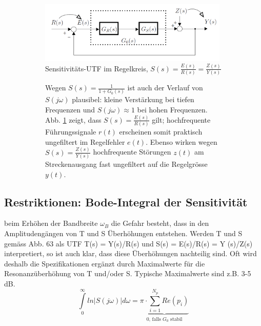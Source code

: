 \begin{figure}[h!]
	\begin{center}
	\begin{subfigure}[b]{9cm}
	\flushleft
			\includegraphics[width=9cm]{./images/SensitivitaetsUTF.png}
\caption{Sensitivitäts-UTF im Regelkreis, $S(s) = \frac{E(s)}{R(s)}=\frac{Z(s)}{Y(s)}$}
			\label{SensitivitaetRegelkreis}
	\end{subfigure}\qquad
	\begin{subfigure}[b]{8cm}
Wegen $S(s) = \frac{1}{1+G_0(s)}$ ist auch der Verlauf von $S(j\omega)$ plausibel: kleine Verstärkung
bei tiefen Frequenzen und $S(j\omega) \approx 1$ bei hohen Frequenzen. Abb. \ref{SensitivitaetRegelkreis} zeigt,
dass $S(s) = \frac{E(s)}{R(s)}$ gilt; hochfrequente Führungssignale $r(t)$ erscheinen somit praktisch
ungefiltert im Regelfehler $e(t)$. Ebenso wirken wegen $S(s) = \frac{Z(s)}{Y(s)}$ hochfrequente Störungen
$z(t)$ am Streckenausgang fast ungefiltert auf die Regelgrösse $y(t)$.

	\end{subfigure}
	\end{center}
\end{figure}



\subsection{Restriktionen: Bode-Integral der Sensitivität }

beim Erhöhen der Bandbreite $\omega_B$
die Gefahr besteht, dass in den Amplitudengängen von T und S Überhöhungen
entstehen. Werden T und S gemäss Abb. 63 als UTF T(s) = Y(s)/R(s) und
S(s) = E(s)/R(s) = Y (s)/Z(s) interpretiert, so ist auch klar, dass diese Überhöhungen
nachteilig sind. Oft wird deshalb die Spezifikationen ergänzt durch Maximalwerte für die Resonanzüberhöhung von
T und/oder S. Typische Maximalwerte sind z.B. 3-5 dB.
\begin{equation}
\int\limits_{0}^{\infty}ln|S(j\omega)|d\omega =\underbrace{\pi\cdot\sum\limits_{i=1}^{N_{p}}Re(p_i)}_\textrm{0, falls $G_0$ stabil}
\label{BodeIntegral}
\end{equation}

